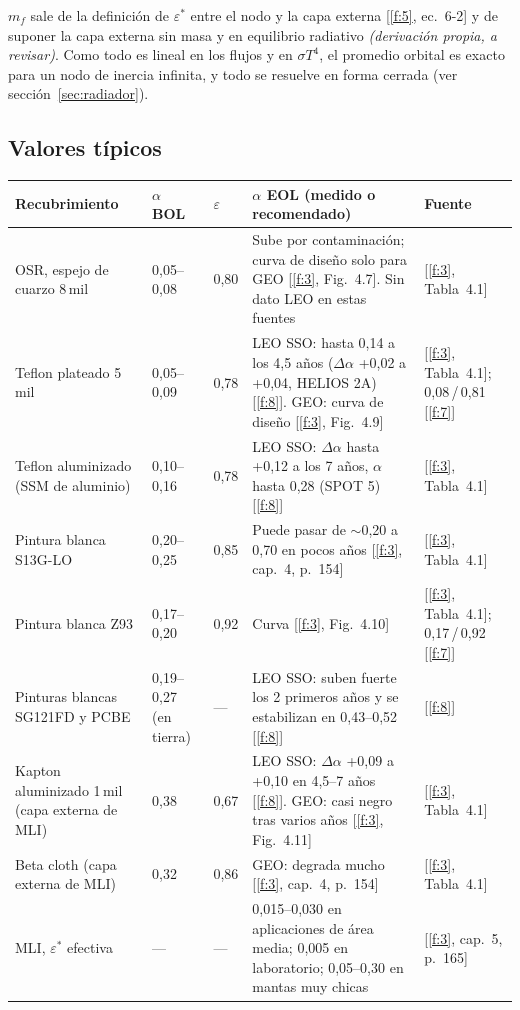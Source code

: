 \documentclass[11pt,a4paper]{article}
\newcommand{\op}[1]{\textcolor{opinion}{\textit{(#1)}}}
\newcommand{\f}[1]{\ref{f:#1}}
\begin{document}
$m_f$ sale de la definición de $\varepsilon^*$ entre el nodo y la capa externa [\f{5}, ec.~6-2] y de suponer la capa externa sin masa y en equilibrio radiativo \op{derivación propia, a revisar}. Como todo es lineal en los flujos y en $\sigma T^4$, el promedio orbital es exacto para un nodo de inercia infinita, y todo se resuelve en forma cerrada (ver sección~\ref{sec:radiador}).

\subsection{Valores típicos}

{\small
\begin{xltabular}{\textwidth}{@{}P{3.1cm}P{1.7cm}P{1.2cm}LP{2.2cm}@{}}
\toprule
\textbf{Recubrimiento} & \textbf{$\alpha$ BOL} & \textbf{$\varepsilon$} & \textbf{$\alpha$ EOL (medido o recomendado)} & \textbf{Fuente} \\
\midrule
\endhead
OSR, espejo de cuarzo 8\,mil & 0,05--0,08 & 0,80 & Sube por contaminación; curva de diseño solo para GEO [\f{3}, Fig.~4.7]. Sin dato LEO en estas fuentes & [\f{3}, Tabla~4.1] \\
Teflon plateado 5\,mil & 0,05--0,09 & 0,78 & LEO SSO: hasta 0,14 a los 4,5 años ($\Delta\alpha$ +0,02 a +0,04, HELIOS 2A) [\f{8}]. GEO: curva de diseño [\f{3}, Fig.~4.9] & [\f{3}, Tabla~4.1]; 0,08\,/\,0,81 [\f{7}] \\
Teflon aluminizado (SSM de aluminio) & 0,10--0,16 & 0,78 & LEO SSO: $\Delta\alpha$ hasta +0,12 a los 7 años, $\alpha$ hasta 0,28 (SPOT 5) [\f{8}] & [\f{3}, Tabla~4.1] \\
Pintura blanca S13G-LO & 0,20--0,25 & 0,85 & Puede pasar de $\sim$0,20 a 0,70 en pocos años [\f{3}, cap.~4, p.~154] & [\f{3}, Tabla~4.1] \\
Pintura blanca Z93 & 0,17--0,20 & 0,92 & Curva [\f{3}, Fig.~4.10] & [\f{3}, Tabla~4.1]; 0,17\,/\,0,92 [\f{7}] \\
Pinturas blancas SG121FD y PCBE & 0,19--0,27 (en tierra) & --- & LEO SSO: suben fuerte los 2 primeros años y se estabilizan en 0,43--0,52 [\f{8}] & [\f{8}] \\
Kapton aluminizado 1\,mil (capa externa de MLI) & 0,38 & 0,67 & LEO SSO: $\Delta\alpha$ +0,09 a +0,10 en 4,5--7 años [\f{8}]. GEO: casi negro tras varios años [\f{3}, Fig.~4.11] & [\f{3}, Tabla~4.1] \\
Beta cloth (capa externa de MLI) & 0,32 & 0,86 & GEO: degrada mucho [\f{3}, cap.~4, p.~154] & [\f{3}, Tabla~4.1] \\
MLI, $\varepsilon^*$ efectiva & --- & --- & 0,015--0,030 en aplicaciones de área media; 0,005 en laboratorio; 0,05--0,30 en mantas muy chicas & [\f{3}, cap.~5, p.~165] \\
\bottomrule
\end{xltabular}
}
\end{document}
